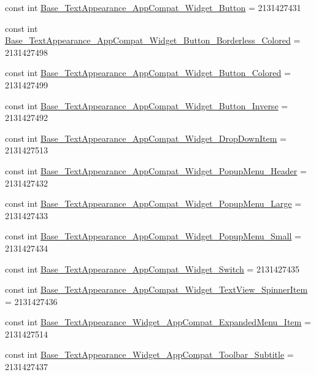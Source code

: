 \begin{CompactItemize}
\item 
const int \hyperlink{class__2doo_1_1_droid_1_1_resource_1_1_style_a319200a32739678cc3e5cf3cb6a6e1c}{Base\_\-TextAppearance\_\-AppCompat\_\-Widget\_\-Button} = 2131427431
\item 
const int \hyperlink{class__2doo_1_1_droid_1_1_resource_1_1_style_8f0c79377272baf10eef3d10222acd58}{Base\_\-TextAppearance\_\-AppCompat\_\-Widget\_\-Button\_\-Borderless\_\-Colored} = 2131427498
\item 
const int \hyperlink{class__2doo_1_1_droid_1_1_resource_1_1_style_6ff0ede2828487769ea9833e7eb852b5}{Base\_\-TextAppearance\_\-AppCompat\_\-Widget\_\-Button\_\-Colored} = 2131427499
\item 
const int \hyperlink{class__2doo_1_1_droid_1_1_resource_1_1_style_21ecc4474a4fd798b012b1d550650dc3}{Base\_\-TextAppearance\_\-AppCompat\_\-Widget\_\-Button\_\-Inverse} = 2131427492
\item 
const int \hyperlink{class__2doo_1_1_droid_1_1_resource_1_1_style_61c45b1534c02f5dbcf721e03af7eaf5}{Base\_\-TextAppearance\_\-AppCompat\_\-Widget\_\-DropDownItem} = 2131427513
\item 
const int \hyperlink{class__2doo_1_1_droid_1_1_resource_1_1_style_8f5ca8a5ede2f922322da1bcfc475963}{Base\_\-TextAppearance\_\-AppCompat\_\-Widget\_\-PopupMenu\_\-Header} = 2131427432
\item 
const int \hyperlink{class__2doo_1_1_droid_1_1_resource_1_1_style_fb6bec23edb777d663164bdaf934b130}{Base\_\-TextAppearance\_\-AppCompat\_\-Widget\_\-PopupMenu\_\-Large} = 2131427433
\item 
const int \hyperlink{class__2doo_1_1_droid_1_1_resource_1_1_style_1089fb70d546dc3d2f3502b32fb2cd2e}{Base\_\-TextAppearance\_\-AppCompat\_\-Widget\_\-PopupMenu\_\-Small} = 2131427434
\item 
const int \hyperlink{class__2doo_1_1_droid_1_1_resource_1_1_style_3b29727ac7f444483a90bded5b13a797}{Base\_\-TextAppearance\_\-AppCompat\_\-Widget\_\-Switch} = 2131427435
\item 
const int \hyperlink{class__2doo_1_1_droid_1_1_resource_1_1_style_353c3fc3bd77e1c3e31f84adb016d587}{Base\_\-TextAppearance\_\-AppCompat\_\-Widget\_\-TextView\_\-SpinnerItem} = 2131427436
\item 
const int \hyperlink{class__2doo_1_1_droid_1_1_resource_1_1_style_eed4a48952a249c88fe8193c3db5b624}{Base\_\-TextAppearance\_\-Widget\_\-AppCompat\_\-ExpandedMenu\_\-Item} = 2131427514
\item 
const int \hyperlink{class__2doo_1_1_droid_1_1_resource_1_1_style_7559c5b5342a1e7282a6319184ef6fc0}{Base\_\-TextAppearance\_\-Widget\_\-AppCompat\_\-Toolbar\_\-Subtitle} = 2131427437

\end{CompactItemize}
